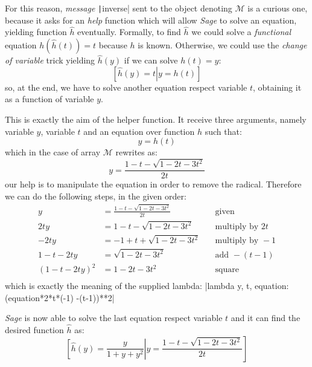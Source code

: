 For this reason, \emph{message} \texttt|inverse| sent to the object
denoting $\mathcal{M}$ is a curious one, because it asks for an \emph{help}
function which will allow \emph{Sage} to solve an equation, yielding function
$\hat{h}$ eventually. Formally, to find $\hat{h}$ we could solve a
\emph{functional} equation $h(\hat{h}(t))=t$ because $h$ is known.  Otherwise,
we could use the \emph{change of variable} trick yielding $\hat{h}(y)$ if we
can solve $h(t)=y$: 
\begin{displaymath}
    \left.\left[\hat{h}(y)=t\right|y=h(t)\right]
\end{displaymath}
so, at the end, we have to solve another equation respect 
variable $t$, obtaining it as a function of variable $y$.

This is exactly the aim of the helper function. It receive three arguments, 
namely variable $y$, variable $t$ and an equation over function $h$ such that:
\begin{displaymath}
    y=h(t)
\end{displaymath}
which in the case of array $\mathcal{M}$ rewrites as:
\begin{displaymath}
    y=\frac{1-t-\sqrt{1-2t-3t^{2}}}{2t}
\end{displaymath}
our help is to manipulate the equation in order to remove the radical. Therefore
we can do the following steps, in the given order:
\begin{displaymath}
    \begin{split}
        y&=\frac{1-t-\sqrt{1-2t-3t^{2}}}{2t} &\quad\text{given}\\
        2ty &=1-t-\sqrt{1-2t-3t^{2}} &\quad\text{multiply by } 2t\\
        -2ty &=-1+t+\sqrt{1-2t-3t^{2}} &\quad\text{multiply by } -1\\
        1-t-2ty &=\sqrt{1-2t-3t^{2}} &\quad\text{add } -(t-1)\\
        \left(1-t-2ty\right)^{2} &=1-2t-3t^{2} &\quad\text{square}\\
    \end{split}
\end{displaymath}
which is exactly the meaning of the supplied lambda: |lambda y, t,
equation: (equation*2*t*(-1) -(t-1))**2| 

\emph{Sage} is now able to solve the last equation respect variable $t$ and it
can find the desired function $\hat{h}$ as:
\begin{displaymath}
    \left.\left[\hat{h}(y)=\frac{y}{1+y+y^{2}}\right|
        y=\frac{1-t-\sqrt{1-2t-3t^{2}}}{2t} \right]
\end{displaymath}

